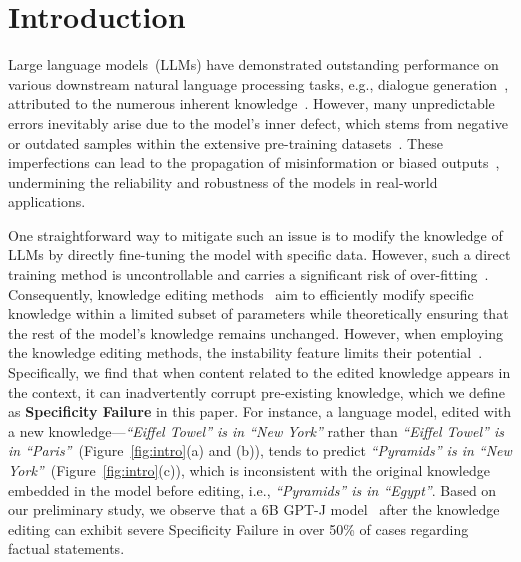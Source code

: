 \section{Introduction}

Large language models~(LLMs) have demonstrated outstanding performance on various downstream natural language processing tasks, e.g., dialogue generation~\citep{ni2023recent, yang2024harnessing}, attributed to the numerous inherent knowledge~\citep{roberts2020much,cao2023retentive}.
However, many unpredictable errors inevitably arise due to the model's inner defect, which stems from negative or outdated samples within the extensive pre-training datasets~\citep{balachandran2022correcting}.  
These imperfections can lead to the propagation of misinformation or biased outputs~\citep{li2023multi,tang2023detoxify}, undermining the reliability and robustness of the models in real-world applications.

One straightforward way to mitigate such an issue is to modify the knowledge of LLMs by directly fine-tuning the model with specific data. However, such a direct training method is uncontrollable and carries a significant risk of over-fitting~\citep{kirkpatrick2017overcoming,zhu2020modifying}.
Consequently, knowledge editing methods~\citep{rome,memit,mend} aim to efficiently modify specific knowledge within a limited subset of parameters while theoretically ensuring that the rest of the model's knowledge remains unchanged.
However, when employing the knowledge editing methods, the instability feature limits their potential~\citep{hoelscher2023detecting}.
Specifically, we find that when content related to the edited knowledge appears in the context, it can inadvertently corrupt pre-existing knowledge, which we define as \textbf{Specificity Failure} in this paper.
For instance, a language model, edited with a new knowledge---\textit{``Eiffel Towel'' is in ``New York''} rather than \textit{``Eiffel Towel'' is in ``Paris''}~(Figure~\ref{fig:intro}(a) and (b)), tends to predict \textit{``Pyramids'' is in ``New York''}~(Figure~\ref{fig:intro}(c)), which is inconsistent with the original knowledge embedded in the model before editing, i.e., \textit{``Pyramids'' is in ``Egypt''}. 
Based on our preliminary study, we observe that a 6B GPT-J model~\citep{gpt-j} after the knowledge editing can exhibit severe Specificity Failure in over 50\% of cases regarding factual statements.


